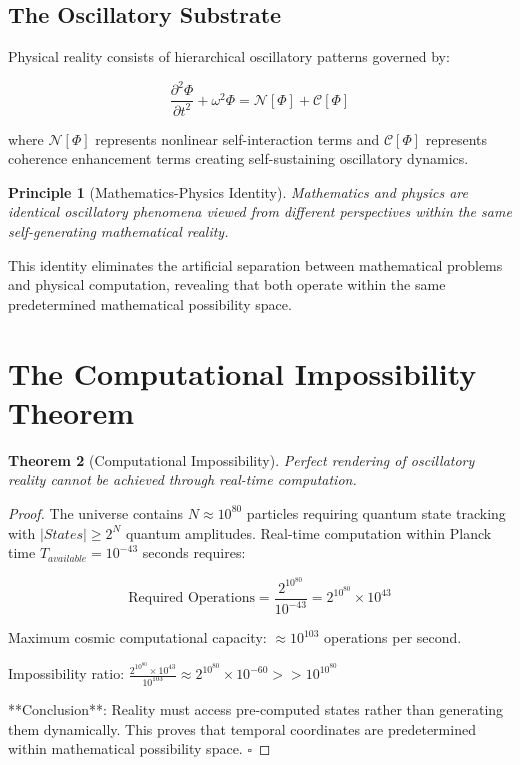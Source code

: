 \documentclass[12pt,a4paper]{article}
\newtheorem{theorem}{Theorem}[section]
\newtheorem{principle}[theorem]{Principle}
\begin{document}
\subsection{The Oscillatory Substrate}

Physical reality consists of hierarchical oscillatory patterns governed by:

$$\frac{\partial^2 \Phi}{\partial t^2} + \omega^2 \Phi = \mathcal{N}[\Phi] + \mathcal{C}[\Phi]$$

where $\mathcal{N}[\Phi]$ represents nonlinear self-interaction terms and $\mathcal{C}[\Phi]$ represents coherence enhancement terms creating self-sustaining oscillatory dynamics.

\begin{principle}[Mathematics-Physics Identity]
Mathematics and physics are identical oscillatory phenomena viewed from different perspectives within the same self-generating mathematical reality.
\end{principle}

This identity eliminates the artificial separation between mathematical problems and physical computation, revealing that both operate within the same predetermined mathematical possibility space.

\section{The Computational Impossibility Theorem}

\begin{theorem}[Computational Impossibility]
Perfect rendering of oscillatory reality cannot be achieved through real-time computation.
\end{theorem}

\begin{proof}
The universe contains $N \approx 10^{80}$ particles requiring quantum state tracking with $|States| \geq 2^{N}$ quantum amplitudes. Real-time computation within Planck time $T_{available} = 10^{-43}$ seconds requires:

$$\text{Required Operations} = \frac{2^{10^{80}}}{10^{-43}} = 2^{10^{80}} \times 10^{43}$$

Maximum cosmic computational capacity: $\approx 10^{103}$ operations per second.

Impossibility ratio: $\frac{2^{10^{80}} \times 10^{43}}{10^{103}} \approx 2^{10^{80}} \times 10^{-60} >> 10^{10^{80}}$

**Conclusion**: Reality must access pre-computed states rather than generating them dynamically. This proves that temporal coordinates are predetermined within mathematical possibility space. $\square$
\end{proof}
\end{document}
